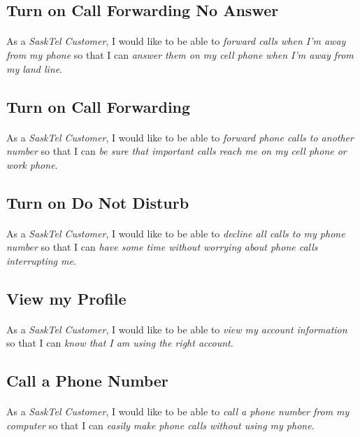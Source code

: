 \documentclass[12pt]{article}
\begin{document}
\subsection{Turn on Call Forwarding No Answer}
\paragraph{}	As a \textit{SaskTel Customer}, I would like to be able to \textit{forward calls when I'm away from my phone} so that I can \textit{answer them on my cell phone when I'm away from my land line}.

\subsection{Turn on Call Forwarding}
\paragraph{}	As a \textit{SaskTel Customer}, I would like to be able to \textit{forward phone calls to another number} so that I can \textit{be sure that important calls reach me on my cell phone or work phone}.

\subsection{Turn on Do Not Disturb}
\paragraph{}	As a \textit{SaskTel Customer}, I would like to be able to \textit{decline all calls to my phone number} so that I can \textit{have some time without worrying about phone calls interrupting me}.

\subsection{View my Profile}
\paragraph{}	As a \textit{SaskTel Customer}, I would like to be able to \textit{view my account information} so that I can \textit{know that I am using the right account}.

\subsection{Call a Phone Number}
\paragraph{}	As a \textit{SaskTel Customer}, I would like to be able to \textit{call a phone number from my computer} so that I can \textit{easily make phone calls without using my phone}.
\end{document}

